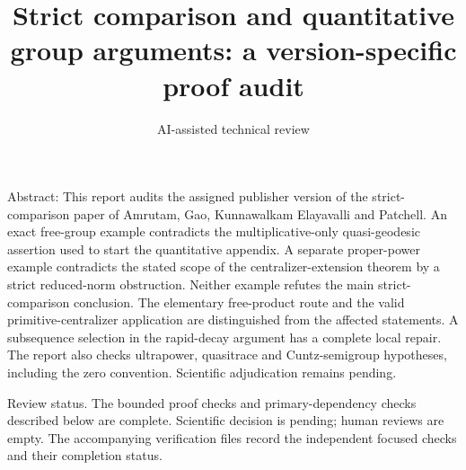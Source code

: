 \documentclass[10pt]{article}
\title{Strict comparison and quantitative group arguments:
a version-specific proof audit}
\author{AI-assisted technical review}
\date{}
\begin{document}
\maketitle
Abstract: This report audits the assigned publisher version of the strict-comparison paper of Amrutam, Gao, Kunnawalkam Elayavalli and Patchell. An exact free-group example contradicts the multiplicative-only quasi-geodesic assertion used to start the quantitative appendix. A separate proper-power example contradicts the stated scope of the centralizer-extension theorem by a strict reduced-norm obstruction. Neither example refutes the main strict-comparison conclusion. The elementary free-product route and the valid primitive-centralizer application are distinguished from the affected statements. A subsequence selection in the rapid-decay argument has a complete local repair. The report also checks ultrapower, quasitrace and Cuntz-semigroup hypotheses, including the zero convention. Scientific adjudication remains pending.\par
Review status. The bounded proof checks and primary-dependency checks described below are complete. Scientific decision is pending; human reviews are empty. The accompanying verification files record the independent focused checks and their completion status.\par
\end{document}
